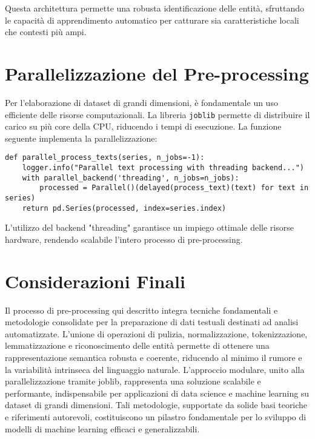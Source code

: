 Questa architettura permette una robusta identificazione delle entità, sfruttando le capacità di apprendimento automatico per catturare sia caratteristiche locali che contesti più ampi.

\section{Parallelizzazione del Pre-processing}
Per l'elaborazione di dataset di grandi dimensioni, è fondamentale un uso efficiente delle risorse computazionali. La libreria \texttt{joblib} permette di distribuire il carico su più core della CPU, riducendo i tempi di esecuzione. La funzione seguente implementa la parallelizzazione:

\begin{lstlisting}[caption={Funzione parallel\_process\_texts}]
def parallel_process_texts(series, n_jobs=-1):
    logger.info("Parallel text processing with threading backend...")
    with parallel_backend('threading', n_jobs=n_jobs):
        processed = Parallel()(delayed(process_text)(text) for text in series)
    return pd.Series(processed, index=series.index)
\end{lstlisting}

L'utilizzo del backend "threading" garantisce un impiego ottimale delle risorse hardware, rendendo scalabile l'intero processo di pre-processing.

\section{Considerazioni Finali}
Il processo di pre-processing qui descritto integra tecniche fondamentali e metodologie consolidate per la preparazione di dati testuali destinati ad analisi automatizzate. L'unione di operazioni di pulizia, normalizzazione, tokenizzazione, lemmatizzazione e riconoscimento delle entità permette di ottenere una rappresentazione semantica robusta e coerente, riducendo al minimo il rumore e la variabilità intrinseca del linguaggio naturale. 
L'approccio modulare, unito alla parallelizzazione tramite joblib, rappresenta una soluzione scalabile e performante, indispensabile per applicazioni di data science e machine learning su dataset di grandi dimensioni. Tali metodologie, supportate da solide basi teoriche e riferimenti autorevoli, costituiscono un pilastro fondamentale per lo sviluppo di modelli di machine learning efficaci e generalizzabili.
